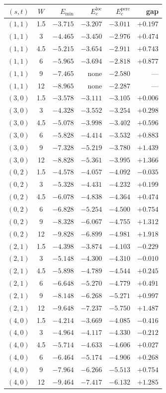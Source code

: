 \begin{tabular}{ccrrrr}
\hline\hline
$(s,t)$ & $W$ & $E_{\min}$ & $E_{c}^{\mathrm{loc}}$ & $E_{c}^{\mathrm{perc}}$ & gap\\
\hline
$(1,1)$ & 1.5 & $-3.715$ & $-3.207$ & $-3.011$ & $+0.197$\\
$(1,1)$ & 3 & $-4.465$ & $-3.450$ & $-2.976$ & $+0.474$\\
$(1,1)$ & 4.5 & $-5.215$ & $-3.654$ & $-2.911$ & $+0.743$\\
$(1,1)$ & 6 & $-5.965$ & $-3.694$ & $-2.818$ & $+0.877$\\
$(1,1)$ & 9 & $-7.465$ & none & $-2.580$ & ---\\
$(1,1)$ & 12 & $-8.965$ & none & $-2.287$ & ---\\
$(3,0)$ & 1.5 & $-3.578$ & $-3.111$ & $-3.105$ & $+0.006$\\
$(3,0)$ & 3 & $-4.328$ & $-3.552$ & $-3.254$ & $+0.298$\\
$(3,0)$ & 4.5 & $-5.078$ & $-3.998$ & $-3.402$ & $+0.596$\\
$(3,0)$ & 6 & $-5.828$ & $-4.414$ & $-3.532$ & $+0.883$\\
$(3,0)$ & 9 & $-7.328$ & $-5.219$ & $-3.780$ & $+1.439$\\
$(3,0)$ & 12 & $-8.828$ & $-5.361$ & $-3.995$ & $+1.366$\\
$(0,2)$ & 1.5 & $-4.578$ & $-4.057$ & $-4.092$ & $-0.035$\\
$(0,2)$ & 3 & $-5.328$ & $-4.431$ & $-4.232$ & $+0.199$\\
$(0,2)$ & 4.5 & $-6.078$ & $-4.838$ & $-4.364$ & $+0.474$\\
$(0,2)$ & 6 & $-6.828$ & $-5.254$ & $-4.500$ & $+0.754$\\
$(0,2)$ & 9 & $-8.328$ & $-6.067$ & $-4.755$ & $+1.312$\\
$(0,2)$ & 12 & $-9.828$ & $-6.899$ & $-4.981$ & $+1.918$\\
$(2,1)$ & 1.5 & $-4.398$ & $-3.874$ & $-4.103$ & $-0.229$\\
$(2,1)$ & 3 & $-5.148$ & $-4.300$ & $-4.310$ & $-0.010$\\
$(2,1)$ & 4.5 & $-5.898$ & $-4.789$ & $-4.544$ & $+0.245$\\
$(2,1)$ & 6 & $-6.648$ & $-5.270$ & $-4.779$ & $+0.491$\\
$(2,1)$ & 9 & $-8.148$ & $-6.268$ & $-5.271$ & $+0.997$\\
$(2,1)$ & 12 & $-9.648$ & $-7.237$ & $-5.750$ & $+1.487$\\
$(4,0)$ & 1.5 & $-4.214$ & $-3.669$ & $-4.085$ & $-0.416$\\
$(4,0)$ & 3 & $-4.964$ & $-4.117$ & $-4.330$ & $-0.212$\\
$(4,0)$ & 4.5 & $-5.714$ & $-4.633$ & $-4.606$ & $+0.027$\\
$(4,0)$ & 6 & $-6.464$ & $-5.174$ & $-4.906$ & $+0.268$\\
$(4,0)$ & 9 & $-7.964$ & $-6.266$ & $-5.513$ & $+0.754$\\
$(4,0)$ & 12 & $-9.464$ & $-7.417$ & $-6.132$ & $+1.285$\\
\hline\hline
\end{tabular}
